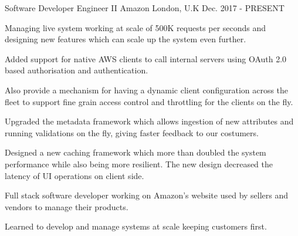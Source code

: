 

\begin{cventries}

  \cventry
    {Software Developer Engineer II} %
    {Amazon} %
    {London, U.K} %
    {Dec. 2017 - PRESENT} %
    {
      \begin{cvitems} %
        \item {Managing live system working at scale of 500K requests per seconds and designing new features which can scale up the system even further.}
        \item {Added support for native AWS clients to call internal servers using OAuth 2.0 based authorisation and authentication.}
        \item {Also provide a mechanism for having a dynamic client configuration across the fleet to support fine grain access control and throttling for the clients on the fly.}
        \item {Upgraded the metadata framework which allows ingestion of new attributes and running validations on the fly, giving faster feedback to our costumers.}
        \item {Designed a new caching framework which more than doubled the system performance while also being more resilient. The new design decreased the latency of UI operations on client side.}
        \item {Full stack software developer working on Amazon's website used by sellers and vendors to manage their products.}
        \item {Learned to develop and manage systems at scale keeping customers first.}
      \end{cvitems}
    }


\end{cventries}
